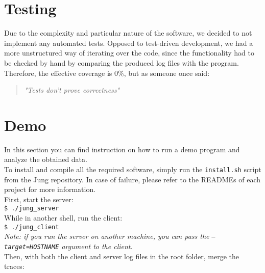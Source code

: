     \section{Testing}

        Due to the complexity and particular nature of the software, we decided to not implement any automated
        tests. Opposed to test-driven development, we had a more unstructured way of iterating over the code,
        since the functionality had to be checked by hand by comparing the produced log files with the program.
        Therefore, the effective coverage is 0\%, but as someone once said:\\

        \begin{quote} 
            \centering 
            \textit{"Tests don't prove correctness"}
        \end{quote}


    \section{Demo}

        In this section you can find instruction on how to run a demo program and analyze the obtained data.\\

        To install and compile all the required software, simply run the \texttt{install.sh} script from the Jung repository.
        In case of failure, please refer to the READMEs of each project for more information.\\

        First, start the server:\\

        \texttt{\$ ./jung\_server}\\
        
        While in another shell, run the client:\\
        
        \texttt{\$ ./jung\_client}\\

        \textit{Note: if you run the server on another machine, you can pass the \texttt{---target=HOSTNAME}
        argument to the client.}\\

        Then, with both the client and server log files in the root folder, merge the traces:\\

